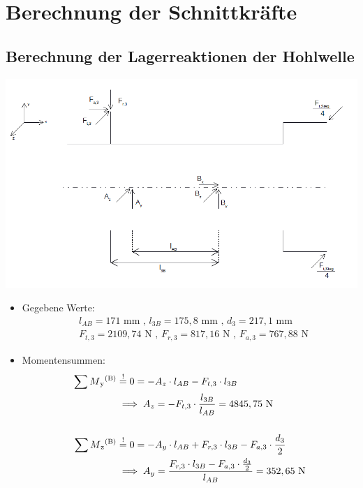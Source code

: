 \newpage
\chapter{Berechnung der Schnittkräfte}
\section{Berechnung der Lagerreaktionen der Hohlwelle}
\begin{center}
	\includegraphics[width=1.04\textwidth,keepaspectratio]{figures/Hohlwelle.png}
\end{center}
\begin{itemize}
	\item Gegebene Werte: 
\begin{align*}
	&l_{AB} =171\text{ mm} \text{ , } l_{3B} = 175,8\text{ mm} \text{ , } d_{3} = 217,1\text{ mm}\\
	&F_{t,3} = 2109,74 \text{ N} \text{ , } F_{r,3}  = 817,16\text{ N} \text{ , } F_{a,3} = 767,88 \text{ N}
\end{align*}
	\item Momentensummen:
\begin{align*}
	 \sum M\textsubscript{y}\textsuperscript{(B)} &\overset{!}{=} 0 = -A_z \cdot l_{AB} - F_{t,3} \cdot l_{3B} \\
	 	&\implies A_z = -F_{t,3} \cdot \frac{l_{3B}}{l_{AB}} = 4845,75 \text{ N} \\ \\
	 \sum M\textsubscript{z}\textsuperscript{(B)} &\overset{!}{=} 0 = -A_y \cdot l_{AB} + F_{r,3} \cdot l_{3B} - F_{a,3} \cdot \frac{d_3}{2}\\
	 	&\implies A_y = \frac{F_{r,3} \cdot l_{3B} - F_{a,3} \cdot \frac{d_3}{2}} {l_{AB}}= 352,65 \text{ N} 
\end{align*}
\end{itemize}

